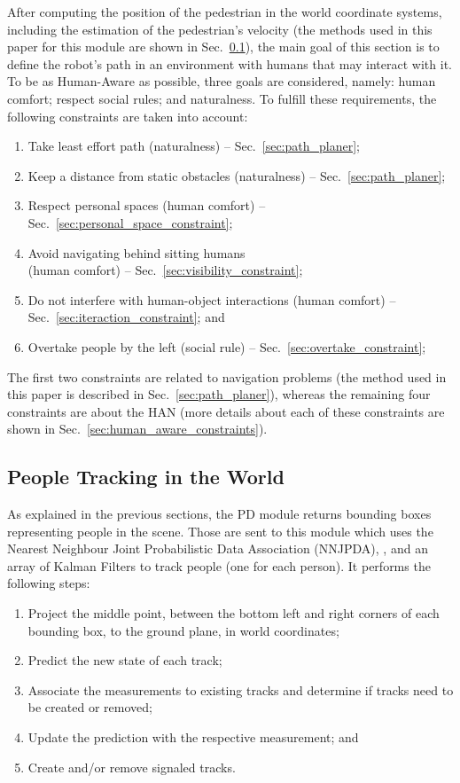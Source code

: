 \documentclass[5p,time]{elsarticle}
\begin{document}
After computing the position of the pedestrian in the world coordinate systems, including the estimation of the pedestrian's velocity (the methods used in this paper for this module are shown in Sec.~\ref{sec:person_tracking}), the main goal of this section is to define the robot's path in an environment with humans that may interact with it. To be as Human-Aware as possible, three goals are considered, namely: human comfort; respect social rules; and naturalness. To fulfill these requirements, the following constraints are taken into account:
\begin{enumerate}
	\item{Take least effort path (naturalness) -- Sec.~\ref{sec:path_planer};} 
	\item{Keep a distance from static obstacles (naturalness) -- Sec.~\ref{sec:path_planer};} 
	\item{Respect personal spaces (human comfort) -- Sec.~\ref{sec:personal_space_constraint};} 
	\item{Avoid navigating behind sitting humans \\ (human comfort) -- Sec.~\ref{sec:visibility_constraint};} 
	\item{Do not interfere with human-object interactions (human comfort) -- Sec.~\ref{sec:iteraction_constraint}; and } 
	\item{Overtake people by the left (social rule) -- Sec.~\ref{sec:overtake_constraint};} 
\end{enumerate}
The first two constraints are related to navigation problems (the method used in this paper is described in Sec.~\ref{sec:path_planer}), whereas the remaining four constraints are about the HAN (more details about each of these constraints are shown in Sec.~\ref{sec:human_aware_constraints}).

\subsection{People Tracking in the World} \label{sec:person_tracking}
As explained in the previous sections, the PD module returns bounding boxes representing people in the scene. Those are sent to this module which uses the Nearest Neighbour Joint Probabilistic Data Association (NNJPDA), \cite{Bar2009}, and an array of Kalman Filters to track people (one for each person). It performs the following steps:
\begin{enumerate}
	\item{Project the middle point, between the bottom left and right corners of each bounding box, to the ground plane, in world coordinates;} 
	\item{Predict the new state of each track;} 
	\item{Associate the measurements to existing tracks and determine if tracks need to be created or removed;} 
	\item{Update the prediction with the respective measurement; and} 
	\item{Create and/or remove signaled tracks.} 
\end{enumerate}
\end{document}
